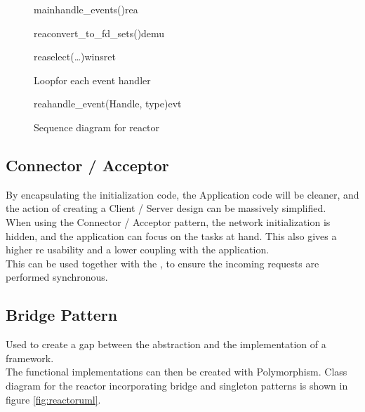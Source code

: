 \documentclass[Main]{subfiles}
\begin{document}
\begin{figure}
\begin {sequencediagram}

	\begin{messcall}{main}{handle\_events()}{rea}
			\begin{messcall}{rea}{convert\_to\_fd\_sets()}{demu}
			\end{messcall}

			\begin{call}{rea}{select(\dots)}{wins}{ret}
			\end{call}

			\begin{sdblock}{Loop}{for each event handler}
				\begin{messcall}{rea}{handle\_event(Handle, type)}{evt}
				\end{messcall}
			\end{sdblock}

		\end{messcall}

\end{sequencediagram}

\caption{Sequence diagram for reactor}
\label{seq:reactorSeq}
\end{figure}


\subsection{Connector / Acceptor}
By encapsulating the initialization code, the Application code will be cleaner, and the action of creating a Client / Server design can be massively simplified.\\
When using the Connector / Acceptor pattern, the network initialization is hidden, and the application can focus on the tasks at hand.
This also gives a higher re usability and a lower coupling with the application.\\
This can be used together with the , to ensure the incoming requests are performed synchronous. 
\subsection{Bridge Pattern}
Used to create a gap between the abstraction and the implementation of a framework.\\
The functional implementations can then be created with Polymorphism. Class diagram for the reactor incorporating bridge and singleton patterns is shown in figure \ref{fig:reactoruml}.
\end{document}
